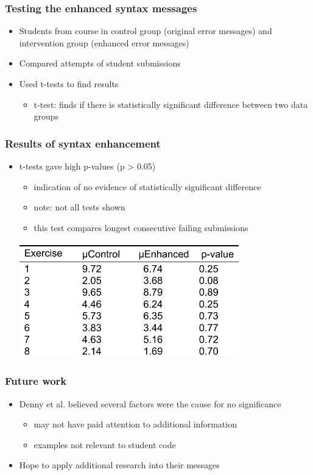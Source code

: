 \documentclass{beamer}
\begin{document}
\begin{frame}
	\frametitle{Testing the enhanced syntax messages}
		\begin{itemize}
			\item Students from course in control group (original error messages) and intervention group (enhanced error messages)
			\item Compared attempts of student submissions
			\item Used t-tests to find results
			\begin{itemize}
				\item t-test: finds if there is statistically significant difference between two data groups
			\end{itemize}
		\end{itemize}

\end{frame}

\begin{frame}
	\frametitle{Results of syntax enhancement}
		\begin{itemize}
			\item t-tests gave high p-values (p > 0.05)
				\begin{itemize}
				\item indication of no evidence of statistically significant difference
				\item note: not all tests shown
				\item this test compares longest consecutive failing submissions 
				\end{itemize}
			\includegraphics[keepaspectratio, width=0.75\textwidth]{EnhancedSyntaxData.pdf}
		\end{itemize}

\end{frame}

\begin{frame}
	\frametitle{Future work}
		\begin{itemize}
			\item Denny et al. believed several factors were the cause for no significance
			\begin{itemize}
				\item may not have paid attention to additional information
				\item examples not relevant to student code
			\end{itemize}
			\item Hope to apply additional research into their messages
		\end{itemize}

\end{frame}
\end{document}
